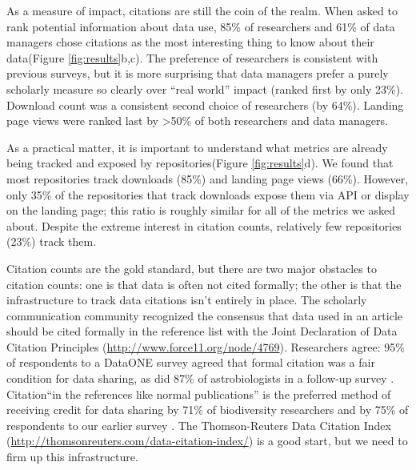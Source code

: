\documentclass[english]{article}
\begin{document}

As a measure of impact, citations are still the coin of the realm.
When asked to rank potential information about data use, 85\% of researchers and 61\% of data managers chose citations as the most interesting thing to know about their data(Figure \ref{fig:results}b,c). 
The preference of researchers is consistent with previous surveys\cite{@kratz_researcher_2015}, but it is more surprising that data managers prefer a purely scholarly measure so clearly over ``real world'' impact (ranked first by only 23\%). 
Download count was a consistent second choice of researchers (by 64\%). 
Landing page views were ranked last by >50\% of both researchers and data managers.

As a practical matter, it is important to understand what metrics are already being tracked and exposed by repositories(Figure \ref{fig:results}d). 
We found that most repositories track downloads (85\%) and landing page views (66\%). 
However, only 35\% of the repositories that track downloads expose them via API or display on the landing page; this ratio is roughly similar for all of the metrics we asked about. 
Despite the extreme interest in citation counts, relatively few repositories (23\%) track them. 


Citation counts are the gold standard, but there are two major obstacles to citation counts: one is that data is often not cited formally; the other is that the infrastructure to track data citations isn't entirely in place.
The scholarly communication community recognized the consensus that data used in an article should be cited formally in the reference list with the Joint Declaration of Data Citation Principles (\url{http://www.force11.org/node/4769}). 
Researchers agree: 95\% of respondents to a DataONE survey agreed that formal citation was a fair condition for data sharing, as did 87\% of astrobiologists in a follow-up survey \cite{@tenopir_data_2011, @aydinoglu_data_2014}. 
Citation``in the references like normal publications'' is the preferred method of receiving credit for data sharing by 71\% of biodiversity researchers and by 75\% of respondents to our earlier survey \cite{@enke_users_2012, @kratz_researcher_2015}.
The Thomson-Reuters Data Citation Index (\url{http://thomsonreuters.com/data-citation-index/}) is a good start, but we need to firm up this infrastructure.
\end{document}
